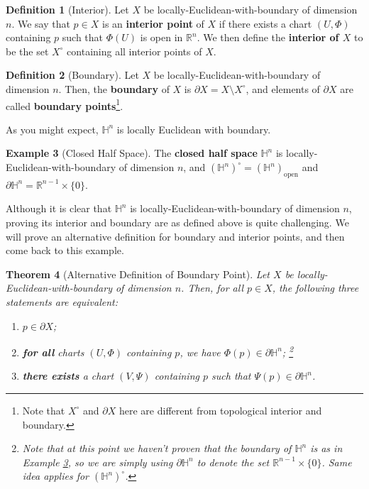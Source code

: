 \documentclass{article}
\newcommand{\R}{\mathbb{R}}
\renewcommand{\H}{\mathbb{H}}
\newcommand{\bdr}{\partial}
\theoremstyle{plain} %
\newtheorem{thm}{Theorem}
\numberwithin{thm}{section} %
\theoremstyle{definition} %
\newtheorem{defn}[thm]{Definition}
\newtheorem{example}[thm]{Example}
\begin{document}
\begin{defn}[Interior]
    Let $X$ be locally-Euclidean-with-boundary of dimension $n$. We say that $p \in X$ is an \textbf{interior point} of $X$ if there exists a chart $(U, \Phi)$ containing $p$ such that $\Phi(U)$ is open in $\R^n$. We then define the \textbf{interior of $X$} to be the set $X^\circ$ containing all interior points of $X$.
\end{defn}

\begin{defn}[Boundary]
    Let $X$ be locally-Euclidean-with-boundary of dimension $n$. Then, the \textbf{boundary} of $X$ is $\bdr X = X \setminus X^\circ$, and elements of $\bdr X$ are called \textbf{boundary points}\footnote{Note that $X^\circ$ and $\bdr X$ here are different from topological interior and boundary.}.
\end{defn}

As you might expect, $\H^n$ is locally Euclidean with boundary.

\begin{example}[Closed Half Space]
    \label{exclosedhalf}
    The \textbf{closed half space} $\H^n$ is locally-Euclidean-with-boundary of dimension $n$, and $(\H^n)^\circ = (\H^n)_{\mathrm{open}}$ and $\bdr\H^n = \R^{n - 1} \times \{0\}$.
\end{example}
Although it is clear that $\H^n$ is locally-Euclidean-with-boundary of dimension $n$, proving its interior and boundary are as defined above is quite challenging. We will prove an alternative definition for boundary and interior points, and then come back to this example.

\begin{thm}[Alternative Definition of Boundary Point]
    \label{altdefbdr}
    Let $X$ be locally-Euclidean-with-boundary of dimension $n$. Then, for all $p \in X$, the following three statements are equivalent:
    \begin{enumerate}[label=\rm(\roman*)]
        \item $p \in \bdr X$;
        \item \textbf{for all} charts $(U, \Phi)$ containing $p$, we have $\Phi(p) \in \bdr\H^n$; \footnote{Note that at this point we haven't proven that the boundary of $\H^n$ is as in Example \ref{exclosedhalf}, so we are simply using $\bdr\H^n$ to denote the set $\R^{n - 1} \times \{0\}$. Same idea applies for $(\H^n)^\circ$.}
        \item \textbf{there exists} a chart $(V, \Psi)$ containing $p$ such that $\Psi(p) \in \bdr\H^n$.
    \end{enumerate}
\end{thm}
\end{document}
